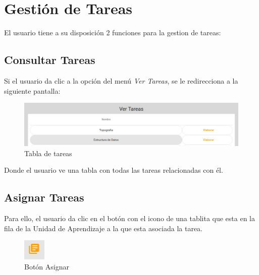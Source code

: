 \section{Gestión de Tareas}
        El usuario tiene a su disposición 2 funciones para la gestion de tareas:
        \subsection{Consultar Tareas}

            Si el usuario da clic a la opción del menú \textit{Ver Tareas}, se le redirecciona a la siguiente pantalla:
            \begin{figure}[H]
                \centering
                \hypertarget{asignart}{\includegraphics[width=0.7\linewidth]{images/Tareas/Vertareas}}
                \caption{Tabla de tareas}
                \label{asignart}
            \end{figure}
            Donde el usuario ve una tabla con todas las tareas relacionadas con él.

        \subsection{Asignar Tareas}

            Para ello, el usuario da clic en el botón con el icono de una tablita que esta en la fila de la Unidad de Aprendizaje a la que esta asociada la tarea.

            \begin{figure}[H]
                \centering
                \hypertarget{boton}{\includegraphics[width=0.7\linewidth]{images/Tareas/boton}}
                \caption{Botón Asignar}
                \label{boton}
            \end{figure}

